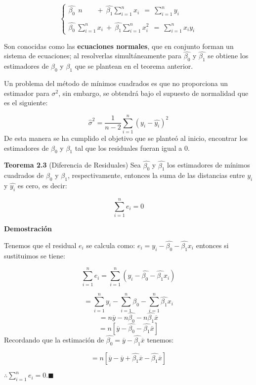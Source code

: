 \documentclass[
  a4paper,
  oneside,
  openany]{book}
\begin{document}
\[
\left\{
\begin{array}{ll} \hat{\beta_{0}} \ \ n  \ \ \  \ \ \ \ \ \ + \ \hat{\beta_{1}}\sum_{i=1}^{n}x_{i}\  \ = \ \sum_{i=1}^{n}y_{i} \\
\\
\hat{\beta_{0}} \ \sum_{i=1}^{n}x_{i} \ + \ \hat{\beta_{1}}\sum_{i=1}^{n}x_{i}^2 \ \ = \ \sum_{i=1}^{n}x_{i}y_{i}
\end{array}
\right. 
\]

Son conocidas como las \textbf{ecuaciones normales}, que en conjunto forman un sistema de ecuaciones; al resolverlas simultáneamente para \(\hat{\beta_{0}}\) y \(\hat{\beta_{1}}\) se obtiene los estimadores de \(\beta_{0}\) y \(\beta_{1}\) que se plantean en el teorema anterior.

Un problema del método de mínimos cuadrados es que no proporciona un estimador para \(\sigma^2\), sin embargo, se obtendrá bajo el supuesto de normalidad que es el siguiente:

\[\hat{\sigma}^2=\frac{1}{n-2}\sum_{i=1}^{n}(y_{i}-\hat{y_{i}})^2\]
De esta manera se ha cumplido el objetivo que se planteó al inicio, encontrar los estimadores de \(\beta_{0}\) y \(\beta_{1}\) tal que los residuales fueran igual a 0.

\textbf{Teorema 2.3} (Diferencia de Residuales) Sea \(\hat{\beta_{0}}\) y \(\hat{\beta_{1}}\) los estimadores de mínimos cuadrados de \(\beta_{0}\) y \(\beta_{1}\), respectivamente, entonces la suma de las distancias entre \(y_{i}\) y \(\hat{y_{i}}\) es cero, es decir:

\[\sum_{i=1}^{n}e_{i}=0\]

\textbf{Demostración}

Tenemos que el residual \(e_{i}\) se calcula como: \(e_{i}=y_{i}-\hat{\beta_{0}}-\hat{\beta_1}x_{i}\) entonces si sustituimos se tiene:

\[\sum_{i=1}^{n}e_{i}=\sum_{i=1}^{n}\left(y_{i}-\hat{\beta_{0}}-\hat{\beta_1}x_{i}\right)\]

\[=\sum_{i=1}^{n}y_{i}-\sum_{i=1}^{n}\hat{\beta_{0}}-\sum_{i=1}^{n}\hat{\beta_{1}}x_{i}\]
\[=n\overline{y}-n\hat{\beta_{0}}-n\hat{\beta_{1}}\overline{x}\]
\[=n\left[\overline{y}-\hat{\beta_{0}}-\hat{\beta_{1}}\overline{x}\right]\]
Recordando que la estimación de \(\hat{\beta_{0}}=\overline{y}-\hat{\beta_{1}}\overline{x}\) tenemos:

\[=n\left[\overline{y}-\overline{y}+\hat{\beta_{1}}\overline{x}-\hat{\beta_{1}}\overline{x}\right]\]

\(\therefore \sum_{i=1}^{n}e_{i}=0. \blacksquare\)
\end{document}
